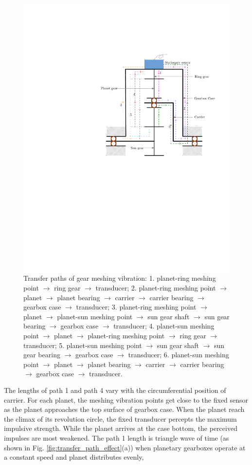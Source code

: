 \documentclass[a4paper,fleqn]{cas-sc}%
\begin{document}
\begin{figure}[pos=htbp]
    \centering
    \includegraphics[scale=0.5]{transfer_path.pdf}
    \caption{Transfer paths of gear meshing vibration: 1. planet-ring meshing point $\to$ ring gear $\to$ transducer; 2. planet-ring meshing point $\to$ planet $\to$ planet bearing $\to$ carrier $\to$ carrier bearing $\to$ gearbox case $\to$ transducer; 3. planet-ring meshing point $\to$ planet $\to$ planet-sun meshing point $\to$ sun gear shaft $\to$ sun gear bearing $\to$ gearbox case $\to$ transducer; 4. planet-sun meshing point $\to$ planet $\to$ planet-ring meshing point $\to$ ring gear $\to$ transducer; 5. planet-sun meshing point $\to$ sun gear shaft $\to$ sun gear bearing $\to$ gearbox case $\to$ transducer; 6. planet-sun meshing point $\to$ planet $\to$ planet bearing $\to$ carrier $\to$ carrier bearing $\to$ gearbox case $\to$ transducer.}\label{fig:transfer_path}
\end{figure}
\par The lengths of path 1 and path 4 vary with the circumferential position of carrier. For each planet, the meshing vibration points get close to the fixed sensor as the planet approaches the top surface of gearbox case. When the planet reach the climax of its revolution circle, the fixed transducer percepts the maximum impulsive strength. While the planet arrives at the case bottom, the perceived impulses are most weakened. The path 1 length is triangle wave of time (as shown in Fig. \ref{fig:transfer_path_effect}(a)) when planetary gearboxes operate at a constant speed and planet distributes evenly, 
\end{document}
